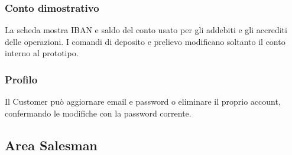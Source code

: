 \par\medskip
\noindent\begin{minipage}{\linewidth}
\subsubsection{Conto dimostrativo}
La scheda mostra IBAN e saldo del conto usato per gli addebiti e gli accrediti delle operazioni. I comandi di deposito e prelievo modificano soltanto il conto interno al prototipo.
\end{minipage}
\clearpage
\noindent\begin{minipage}{\linewidth}
\subsubsection{Profilo}
Il Customer può aggiornare email e password o eliminare il proprio account, confermando le modifiche con la password corrente.
\end{minipage}
\par\medskip

\subsection{Area Salesman}

